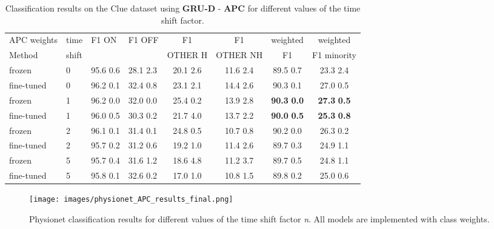 \documentclass{article}
\begin{document}
\begin{table}[h]
\caption{
Classification results on the Clue dataset using \textbf{GRU-D} - \textbf{APC} for different values of the time shift factor.}
\label{tab:results_clue_APC_GRUD}
\vskip 0.1in
\begin{center}
\begin{small}
\begin{sc}
\begin{tabular}{llllcccc}
\toprule
{APC weights} & {time} &  {F1 ON} & {F1 OFF} & {F1} & {F1} & {weighted} & {weighted}\\
{Method} & {shift} &  &  & {OTHER H} & {OTHER NH} & {F1} & {F1 minority}\\
\midrule
{frozen} & 0 & 95.6  0.6 & 28.1  2.3 & 20.1  2.6 & 11.6   2.4 & 89.5  0.7 & 23.3  2.4\\
\hline
{fine-tuned} &  0 & 96.2  0.1 & 32.4  0.8 & 23.1  2.1 & 14.4  2.6 & 90.3  0.1 & 27.0  0.5\\
\hline
{frozen} & 1 &  96.2  0.0 & 32.0  0.0 & 25.4  0.2 & 13.9   2.8 &  \textbf{90.3}  \textbf{0.0} & \textbf{27.3}  \textbf{0.5} \\
\hline
{fine-tuned} &  1 & 96.0  0.5 & 30.3  0.2 & 21.7  4.0 & 13.7  2.2 & \textbf{90.0}  \textbf{0.5} & \textbf{25.3}  \textbf{0.8} \\
\hline
{frozen} &  2 &  96.1  0.1 & 31.4  0.1 & 24.8  0.5 & 10.7   0.8 & 90.2  0.0 & 26.3  0.2\\
\hline
{fine-tuned} &  2 &  95.7  0.2  & 31.2  0.6  &  19.2  1.0 & 11.4  2.6  & 89.7  0.3 & 24.9  1.1 \\
\hline
{frozen} &  5 & 95.7  0.4 & 31.6  1.2 & 18.6  4.8 & 11.2  3.7 &  89.7  0.5 & 24.8  1.1\\
\hline
{fine-tuned} &  5 & 95.8  0.1 & 32.6  0.2 & 17.0  1.0 & 10.8  1.5 & 89.8  0.2 & 25.0  0.6\\
\bottomrule
\end{tabular}
\end{sc}
\end{small}
\end{center}
\vskip -0.15in
\end{table}

\begin{figure}[h]
\begin{center}
\centerline{\texttt{[image: images/physionet\_APC\_results\_final.png]}}
\vspace{-4mm}
\caption{Physionet classification results for different values of the time shift factor \textit{n}. All models are implemented with class weights.} 
\vspace{-2.5em}
\label{physionet_APC_plot}
\end{center}
\end{figure} 
\end{document}
